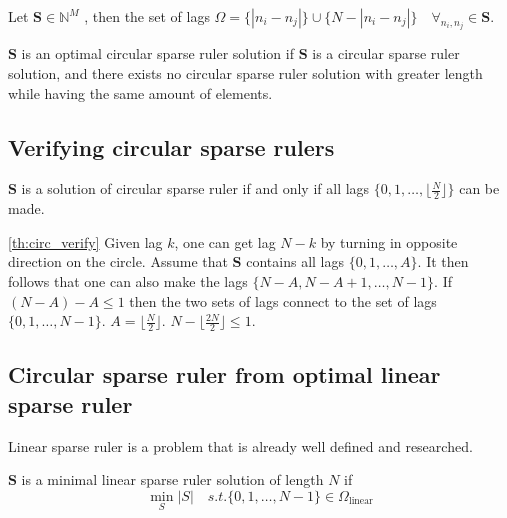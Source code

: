 \documentclass[a4paper, openany, oneside]{memoir}
\begin{document}
\begin{blockDefinition}\label{dif:lags}
    Let $\mathbf{S} \in \mathbb{N}^M$ , then the set of lags $\Omega = \{|n_i-n_j|\} \cup \{N-|n_i-n_j|\} \quad \forall_{n_i,n_j}\in \mathbf{S}$.
\end{blockDefinition}
    

\begin{blockDefinition}
    $\mathbf{S}$ is an optimal circular sparse ruler solution if $\mathbf{S}$ is a circular sparse ruler solution, and there exists no circular sparse ruler solution with greater length while having the same amount of elements.
\end{blockDefinition}

\subsection{Verifying circular sparse rulers}

\begin{blockTheorem} \label{th:circ_verify}\nolinebreak
    $\mathbf{S}$ is a solution of circular sparse ruler if and only if all lags $\{0,1,\dots, \lfloor\frac{N}{2}\rfloor\}$ can be made. \nolinebreak
\end{blockTheorem}

\begin{blockProofTheorem}{\ref{th:circ_verify}}
    Given lag $k$, one can get lag $N-k$ by turning in opposite direction on the circle. Assume that $\mathbf{S}$ contains all lags $\{0,1,\dots, A\}$. It then follows that one can also make the lags  $\{N-A,N-A+1,\dots, N-1\}$. If $(N-A)-A \leq 1$ then the two sets of lags connect to the set of lags $\{0,1,\dots,N-1\}$. $A=\lfloor\frac{N}{2}\rfloor$. $N-\lfloor\frac{2N}{2}\rfloor \leq 1$.
\end{blockProofTheorem}

\subsection{Circular sparse ruler from optimal linear sparse ruler}\label{ssec:minimal_linear_s}
Linear sparse ruler is a problem that is already well defined and researched. 

\begin{blockDefinition}\label{def:minimal_sparse}
    $\mathbf{S}$ is a minimal linear sparse ruler solution of length $N$ if 
    $$
    \min_S|S| \quad s.t. \{0,1,\dots,N-1\} \in \Omega_{\text{linear}}
    $$
\end{blockDefinition}
\end{document}
